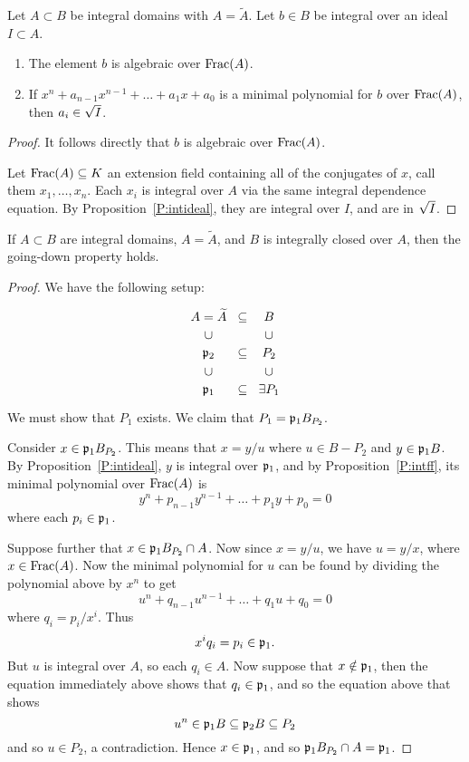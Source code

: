 \documentclass{ximera}
\begin{document}
\begin{proposition}\label{P:intff}
  Let $A\subset B$ be integral domains with $A = \tilde{A}$. Let $b\in
  B$ be integral over an ideal $I\subset A$.
  \begin{enumerate}
  \item The element $b$ is algebraic over $\operatorname{Frac}(A)$.
  \item If $x^n + a_{n-1}x^{n-1} + \dots + a_1 x + a_0$ is a minimal
    polynomial for $b$ over $\operatorname{Frac}(A)$, then $a_i\in \sqrt{I}$.
  \end{enumerate}
  \begin{proof}
    It follows directly that $b$ is algebraic over $\operatorname{Frac}(A)$.

    Let $\operatorname{Frac}(A)\subseteq K$ an extension field containing all of the
    conjugates of $x$, call them $x_1,\dots, x_n$. Each $x_i$ is
    integral over $A$ via the same integral dependence equation. By
    Proposition~\ref{P:intideal}, they are integral over $I$, and are
    in $\sqrt{I}$.
  \end{proof}
\end{proposition}


\begin{theorem}
  If $A\subset B$ are integral domains, $A=\tilde{A}$, and $B$ is
  integrally closed over $A$, then the going-down property holds.
  \begin{proof}
    We have the following setup:
    \[
    \begin{tikzcd}[row sep=0em,column sep=0em]
      A=\tilde{A}    & \subset & B \\
      \cup &         & \cup \\
      \p_2 & \subset & P_2 \\
      \cup &         & \cup \\
      \p_1 & \subset & \exists P_1  
    \end{tikzcd}
    \]
    We must show that $P_1$ exists. We claim that $P_1 = \mathfrak{p}_1 B_{P_2}$.

    Consider $x\in \mathfrak{p}_1 B_{P_2}$. This means that $x = y/u$ where
    $u\in B-P_2$ and $y\in \mathfrak{p}_1 B$. By Proposition~\ref{P:intideal},
    $y$ is integral over $\mathfrak{p}_1$, and by Proposition~\ref{P:intff}, its
    minimal polynomial over $\operatorname{Frac}(A)$ is
    \[
    y^n + p_{n-1}y^{n-1} + \dots + p_1 y + p_0 = 0
    \]
    where each $p_i\in\mathfrak{p}_1$.

    Suppose further that $x\in \mathfrak{p}_1 B_{P_2}\cap A$. Now since $x =
    y/u$, we have $u = y/x$, where $x\in\operatorname{Frac}(A)$. Now the minimal
    polynomial for $u$ can be found by dividing the polynomial above
    by $x^n$ to get
    \[
    u^n + q_{n-1} u^{n-1} + \dots + q_1 u + q_0 = 0
    \]
    where $q_i = p_i/x^i$. Thus
    \[
    x^i q_i = p_i \in \mathfrak{p}_1.
    \]
    But $u$ is integral over $A$, so each $q_i\in A$. Now suppose that
    $x\notin\mathfrak{p}_1$, then the equation immediately above shows that
    $q_i\in\mathfrak{p}_1$, and so the equation above that shows
    \[
    u^n\in \mathfrak{p}_1 B \subseteq \mathfrak{p}_2 B \subseteq P_2
    \]
    and so $u\in P_2$, a contradiction. Hence $x\in \mathfrak{p}_1$, and so
    $\mathfrak{p}_1 B_{P_2}\cap A = \mathfrak{p}_1$.
  \end{proof}
\end{theorem}
\end{document}
